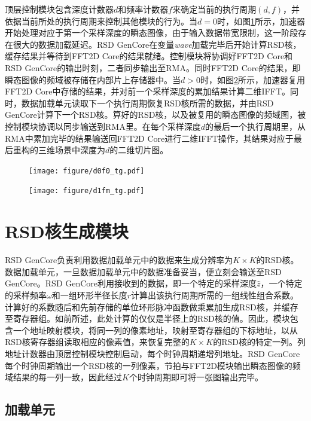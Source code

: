 \documentclass[master]{shtthesis}             %
\begin{document}
顶层控制模块包含深度计数器$d$和频率计数器$f$来确定当前的执行周期$(d,f)$，并依据当前所处的执行周期来控制其他模块的行为。当$d=0$时，如图\ref{fig:tg_d0}所示，加速器开始处理对应于第一个采样深度的瞬态图像，由于输入数据带宽限制，这一阶段存在很大的数据加载延迟。RSD GenCore在变量\textit{wave}加载完毕后开始计算RSD核，缓存结果并等待到FFT2D Core的结果就绪。控制模块将协调好FFT2D Core和RSD GenCore的输出时刻，二者同步输出至RMA。同时FFT2D Core的结果，即瞬态图像的频域被存储在内部片上存储器中。当$d>0$时，如图\ref{fig:tg_d1}所示，加速器复用FFT2D Core中存储的结果，并对前一个采样深度的累加结果计算二维IFFT。同时，数据加载单元读取下一个执行周期恢复RSD核所需的数据，并由RSD GenCore计算下一个RSD核。算好的RSD核，以及被复用的瞬态图像的频域图，被控制模块协调以同步输送到RMA里。在每个采样深度$d$的最后一个执行周期里，从RMA中累加完毕的结果输送回FFT2D Core进行二维IFFT操作，其结果对应于最后重构的三维场景中深度为$d$的二维切片图。
\begin{figure}[!tb]
    \centering
    \texttt{[image: figure/d0f0\_tg.pdf]}
    \label{fig:tg_d0}
\end{figure}
\begin{figure}[!tb]
    \centering
    \texttt{[image: figure/d1fm\_tg.pdf]}
    \label{fig:tg_d1}
\end{figure}

\section{RSD核生成模块}

RSD GenCore负责利用数据加载单元中的数据来生成分辨率为$K\times K$的RSD核。数据加载单元，一旦数据加载单元中的数据准备妥当，便立刻会输送至RSD GenCore。RSD GenCore利用接收到的数据，即一个特定的采样深度$\hat{z}$，一个特定的采样频率$\omega$和一组环形半径长度$r$计算出该执行周期所需的一组线性组合系数。计算好的系数随后和先前存储的单位环形脉冲函数做乘累加生成RSD核，并缓存至寄存器组。如前所述，此处计算的仅仅是半径上的RSD核的值。因此，模块包含一个地址映射模块，将同一列的像素地址，映射至寄存器组的下标地址，以从RSD核寄存器组读取相应的像素值，来恢复完整的$K\times K$的RSD核的特定一列。列地址计数器由顶层控制模块控制启动，每个时钟周期递增列地址。RSD GenCore每个时钟周期输出一个RSD核的一列像素，节拍与FFT2D模块输出瞬态图像的频域结果的每一列一致，因此经过$K$个时钟周期即可将一张图输出完毕。

\subsection{加载单元}
\end{document}
